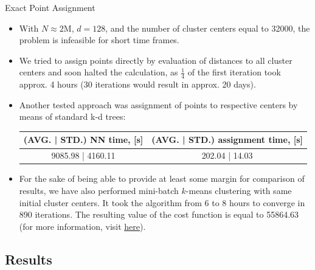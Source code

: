 \begin{frame}
	
	\begin{block}{Exact Point Assignment}
		
		\begin{itemize}
			\item With $N \approx 2$M, $d = 128$, and the number of cluster centers equal to 32000, the problem is infeasible for short time frames.
			
			\item We tried to assign points directly by evaluation of distances to all cluster centers and soon halted the calculation, as $\frac{1}{4}$ of the first iteration took approx. 4 hours (30 iterations would result in approx. 20 days).
			
			\item Another tested approach was assignment of points to respective centers by means of standard k-d trees:
			
			\begin{table}
				\scriptsize
				\begin{tabular}{| c | c |}
					\hline
					(AVG. | STD.) NN time, [s] & (AVG. | STD.) assignment time, [s] \\
					\hline
					\hline			
					9085.98 | 4160.11 & 202.04 | 14.03 \\
					\hline  
				\end{tabular}
			\end{table}
			
			\item For the sake of being able to provide at least some margin for comparison of results, we have also performed mini-batch $k$-means clustering \cite{Sculley2010} with same initial cluster centers. It took the algorithm from 6 to 8 hours to converge in 890 iterations. The resulting value of the cost function is equal to 55864.63 (for more information, visit \href{https://github.com/salisaresama/computer-vision/blob/master/_aux/kmeans_std.ipynb}{{\color{blue} \underline{here}}}).
		\end{itemize}
		
	\end{block}

\end{frame}


\subsection{Results}

